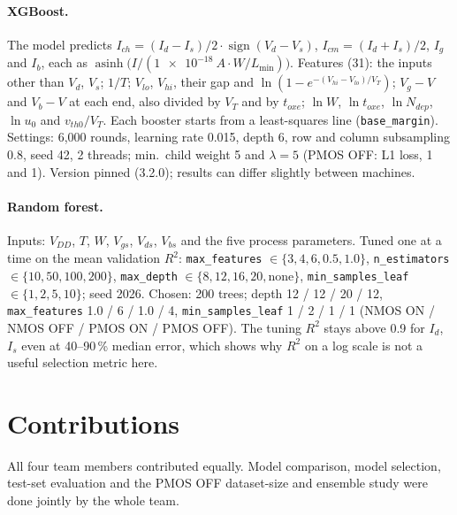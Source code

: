 \documentclass[11pt,a4paper]{article}
\begin{document}
\paragraph{XGBoost.} The model predicts $I_{ch} = (I_d - I_s)/2 \cdot \operatorname{sign}(V_d - V_s)$,
$I_{cm} = (I_d + I_s)/2$, $I_g$ and $I_b$, each as
$\operatorname{asinh}\bigl(I / (\SI{1e-18}{A}\cdot W/L_{\min})\bigr)$. Features (31): the inputs other than
$V_d$, $V_s$; $1/T$; $V_{lo}$, $V_{hi}$, their gap and $\ln(1 - e^{-(V_{hi}-V_{lo})/V_T})$; $V_g - V$ and
$V_b - V$ at each end, also divided by $V_T$ and by $t_{oxe}$; $\ln W$, $\ln t_{oxe}$, $\ln N_{dep}$,
$\ln u_0$ and $v_{th0}/V_T$. Each booster starts from a least-squares line (\texttt{base\_margin}).
Settings: 6{,}000 rounds, learning rate 0.015, depth 6, row and column subsampling 0.8, seed 42, 2 threads;
min.\ child weight 5 and $\lambda = 5$ (PMOS OFF: L1 loss, 1 and 1). Version pinned (3.2.0); results can
differ slightly between machines.

\paragraph{Random forest.} Inputs: $V_{DD}$, $T$, $W$, $V_{gs}$, $V_{ds}$, $V_{bs}$ and the five process
parameters. Tuned one at a time on the mean validation $R^2$:
\texttt{max\_features} $\in\{3, 4, 6, 0.5, 1.0\}$, \texttt{n\_estimators} $\in\{10, 50, 100, 200\}$,
\texttt{max\_depth} $\in\{8, 12, 16, 20, \text{none}\}$, \texttt{min\_samples\_leaf} $\in\{1, 2, 5, 10\}$;
seed 2026. Chosen: 200 trees; depth 12 / 12 / 20 / 12, \texttt{max\_features} 1.0 / 6 / 1.0 / 4,
\texttt{min\_samples\_leaf} 1 / 2 / 1 / 1 (NMOS ON / NMOS OFF / PMOS ON / PMOS OFF). The tuning $R^2$ stays
above 0.9 for $I_d$, $I_s$ even at 40--90\,\% median error, which shows why $R^2$ on a log scale is not a
useful selection metric here.

\section*{Contributions}
All four team members contributed equally. Model comparison, model selection, test-set evaluation and
the PMOS OFF dataset-size and ensemble study were done jointly by the whole team.

\newcommand{\contrib}[1]{\begin{minipage}[t]{\linewidth}\raggedright
  \begin{itemize}[nosep, leftmargin=*]#1\end{itemize}\end{minipage}}
\end{document}

